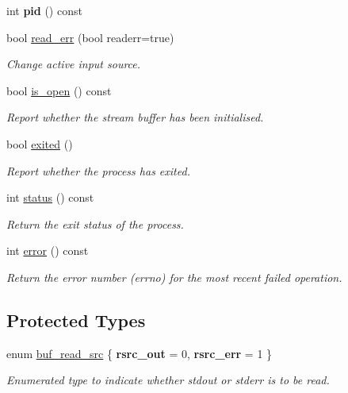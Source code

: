\begin{DoxyCompactItemize}
int {\bfseries pid} () const
\item 
bool \mbox{\hyperlink{classredi_1_1basic__pstreambuf_ac831c1a0ec6deb5ef2cbcab5cf510969}{read\+\_\+err}} (bool readerr=true)
\begin{DoxyCompactList}\small\item\em Change active input source. \end{DoxyCompactList}\item 
bool \mbox{\hyperlink{classredi_1_1basic__pstreambuf_af28fab6dc978b25c92740400512a61bc}{is\+\_\+open}} () const
\begin{DoxyCompactList}\small\item\em Report whether the stream buffer has been initialised. \end{DoxyCompactList}\item 
bool \mbox{\hyperlink{classredi_1_1basic__pstreambuf_a9ed1ec24bfa867c99b6bf8a35a94d063}{exited}} ()
\begin{DoxyCompactList}\small\item\em Report whether the process has exited. \end{DoxyCompactList}\item 
int \mbox{\hyperlink{classredi_1_1basic__pstreambuf_a2ad82c80f955784adfd34a1608a15193}{status}} () const
\begin{DoxyCompactList}\small\item\em Return the exit status of the process. \end{DoxyCompactList}\item 
int \mbox{\hyperlink{classredi_1_1basic__pstreambuf_a87e5bc3b59a7cb3f72fd81ebde783c13}{error}} () const
\begin{DoxyCompactList}\small\item\em Return the error number (errno) for the most recent failed operation. \end{DoxyCompactList}\end{DoxyCompactItemize}
\subsection*{Protected Types}
\begin{DoxyCompactItemize}
\item 
\mbox{\label{classredi_1_1basic__pstreambuf_a8a3f6a830b6035ed755188e32ffffadc}} 
enum \mbox{\hyperlink{classredi_1_1basic__pstreambuf_a8a3f6a830b6035ed755188e32ffffadc}{buf\+\_\+read\+\_\+src}} \{ {\bfseries rsrc\+\_\+out} = 0, 
{\bfseries rsrc\+\_\+err} = 1
 \}
\begin{DoxyCompactList}\small\item\em Enumerated type to indicate whether stdout or stderr is to be read. \end{DoxyCompactList}\end{DoxyCompactItemize}
